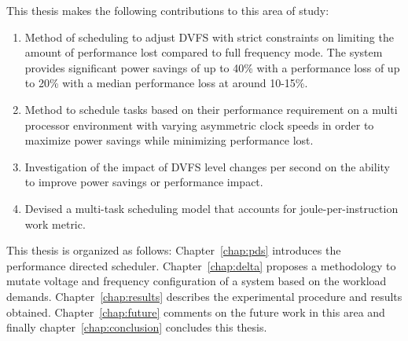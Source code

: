 This thesis makes the following contributions to this area of study:
\begin{enumerate}
\item Method of scheduling to adjust DVFS with
strict constraints on limiting the amount of performance lost compared
to full frequency mode. The system provides significant power savings of up to 40\% 
with a performance loss of up to 20\% with a median performance loss at around 10-15\%.
\item Method to schedule tasks based on their performance requirement on a multi processor
environment with varying asymmetric clock speeds in order to maximize power savings
while minimizing performance lost. 
\item Investigation of the impact of DVFS level changes per second on the ability to improve power savings
or performance impact.
\item Devised a multi-task scheduling model that accounts for joule-per-instruction work metric.
\end{enumerate}


This thesis is organized as follows:
Chapter~\ref{chap:pds} introduces the performance directed scheduler.
Chapter~\ref{chap:delta} proposes a methodology to mutate voltage and 
frequency configuration of a system based on the workload demands. 
Chapter~\ref{chap:results} describes the experimental procedure
and results obtained. Chapter~\ref{chap:future} comments on the future
work in this area and finally chapter~\ref{chap:conclusion} concludes this
thesis.   

